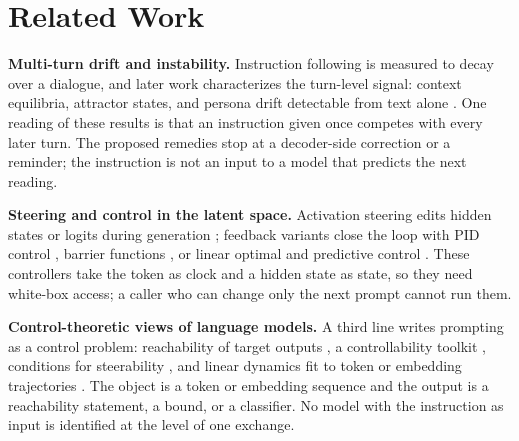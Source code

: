 \section{Related Work}
\label{sec:related}

\textbf{Multi-turn drift and instability.}
Instruction following is measured to decay over a dialogue, and later work characterizes the turn-level signal: context equilibria, attractor states, and persona drift detectable from text alone \citep{li2024instability, dongre2025driftnomore, ko2026attractor, wang2026nautilus, luo2026spasm}.
One reading of these results is that an instruction given once competes with every later turn.
The proposed remedies stop at a decoder-side correction or a reminder; the instruction is not an input to a model that predicts the next reading.

\textbf{Steering and control in the latent space.}
Activation steering edits hidden states or logits during generation \citep{allbert2024personality, yang2025lfsteering, shi2026unisteer}; feedback variants close the loop with PID control \citep{nguyen2026pidsteering, bharadwaj2025pidreasoning}, barrier functions \citep{miyaoka2024cbfllm, miyaoka2025cbfllm2, tran2026barriersteer, hu2025nbfllm}, or linear optimal and predictive control \citep{cheng2024liseco, skifstad2026alqr, kong2024recontrol}.
These controllers take the token as clock and a hidden state as state, so they need white-box access; a caller who can change only the next prompt cannot run them.

\textbf{Control-theoretic views of language models.}
A third line writes prompting as a control problem: reachability of target outputs \citep{bhargava2023magicword}, a controllability toolkit \citep{cheng2026genctrl}, conditions for steerability \citep{fan2026steerable}, and linear dynamics fit to token or embedding trajectories \citep{akrout2026distinguishability, akrout2026dmdsafety, nosrati2026controlmeetsllm}.
The object is a token or embedding sequence and the output is a reachability statement, a bound, or a classifier.
No model with the instruction as input is identified at the level of one exchange.

